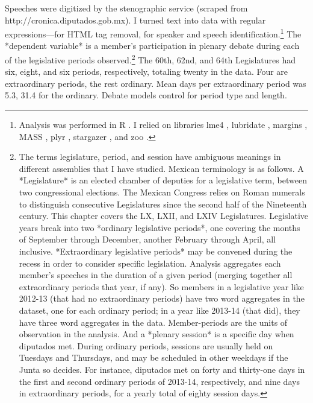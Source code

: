 \documentclass[letter,12pt]{article}
\begin{document}
Speeches were digitized by the stenographic service (scraped from http://cronica.diputados.gob.mx). I turned text into data with regular expressions---for HTML tag removal, for speaker and speech identification.\footnote{Analysis was performed in R \citep{r.cite}. I relied on libraries lme4 \citep{r.lme4}, lubridate \citep{r.lubridate}, margins \citep{r.margins}, MASS \citep{r.mass}, plyr \citep{r.plyr}, stargazer \citep{r.stargazer}, and zoo \citep{r.zoo}.} The *dependent variable* is a member's participation in plenary debate during each of the legislative periods observed.\footnote{The terms legislature, period, and session have ambiguous meanings in different assemblies that I have studied. Mexican terminology is as follows. A *Legislature* is an elected chamber of deputies for a legislative term, between two congressional elections. The Mexican Congress relies on Roman numerals to distinguish consecutive Legislatures since the second half of the Nineteenth century. This chapter covers the LX, LXII, and LXIV Legislatures. Legislative years break into two *ordinary legislative periods*, one covering the months of September through December, another February through April, all inclusive. *Extraordinary legislative periods* may be convened during the recess in order to consider specific legislation. Analysis aggregates each member's speeches in the duration of a given period (merging together all extraordinary periods that year, if any). So members in a legislative year like 2012-13 (that had no extraordinary periods) have two word aggregates in the dataset, one for each ordinary period; in a year like 2013-14 (that did), they have three word aggregates in the data. Member-periods are the units of observation in the analysis. And a *plenary session* is a specific day when diputados met. During ordinary periods, sessions are usually held on Tuesdays and Thursdays, and may be scheduled in other weekdays if the Junta so decides. For instance, diputados met on forty and thirty-one days in the first and second ordinary periods of 2013-14, respectively, and nine days in extraordinary periods, for a yearly total of eighty session days.} The 60th, 62nd, and 64th Legislatures had six, eight, and six periods, respectively, totaling twenty in the data. Four are extraordinary periods, the rest ordinary. Mean days per extraordinary period was 5.3, 31.4 for the ordinary. Debate models control for period type and length. 
\end{document}
